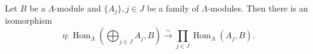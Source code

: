 Let $B$ be a $\Lambda$-module and $\{A_j\}, j \in J$ be a family of $\Lambda$-modules. Then there is an isomorphism
$$\eta : \operatorname{Hom}_\Lambda \left( \bigoplus_{j \in J} A_j, B \right) \xrightarrow{\sim} \prod_{j \in J} \operatorname{Hom}_\Lambda(A_j, B).$$
